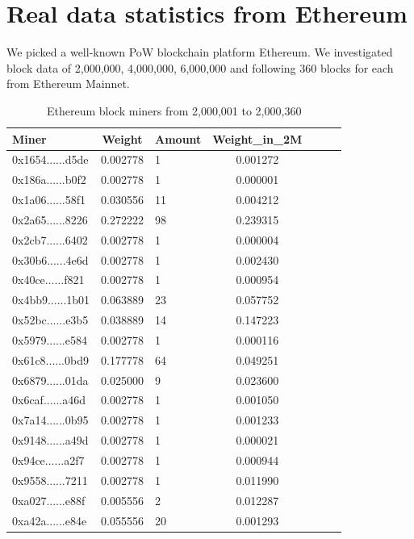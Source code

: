 \documentclass[conference]{IEEEtran}
\begin{document}
\section{Real data statistics from Ethereum}

We picked a well-known PoW blockchain platform Ethereum. We investigated block data of 2,000,000, 4,000,000, 6,000,000 and following 360 blocks for each from Ethereum Mainnet.

\begin{table}[htbp]
\caption{Ethereum block miners from 2,000,001 to 2,000,360}
\begin{center}
\begin{tabular}{lclclcl}
\hline
Miner                                      & Weight   & Amount & Weight\_in\_2M \\
\hline
0x1654......d5de & 0.002778 & 1      & 0.001272       \\
0x186a......b0f2 & 0.002778 & 1      & 0.000001       \\
0x1a06......58f1 & 0.030556 & 11     & 0.004212       \\
0x2a65......8226 & 0.272222 & 98     & 0.239315       \\
0x2cb7......6402 & 0.002778 & 1      & 0.000004       \\
0x30b6......4e6d & 0.002778 & 1      & 0.002430       \\
0x40ce......f821 & 0.002778 & 1      & 0.000954       \\
0x4bb9......1b01 & 0.063889 & 23     & 0.057752       \\
0x52bc......e3b5 & 0.038889 & 14     & 0.147223       \\
0x5979......e584 & 0.002778 & 1      & 0.000116       \\
0x61c8......0bd9 & 0.177778 & 64     & 0.049251       \\
0x6879......01da & 0.025000 & 9      & 0.023600       \\
0x6caf......a46d & 0.002778 & 1      & 0.001050       \\
0x7a14......0b95 & 0.002778 & 1      & 0.001233       \\
0x9148......a49d & 0.002778 & 1      & 0.000021       \\
0x94ce......a2f7 & 0.002778 & 1      & 0.000944       \\
0x9558......7211 & 0.002778 & 1      & 0.011990       \\
0xa027......e88f & 0.005556 & 2      & 0.012287       \\
0xa42a......e84e & 0.055556 & 20     & 0.001293       \\

\end{tabular}
\end{center}
\end{table}
\end{document}
